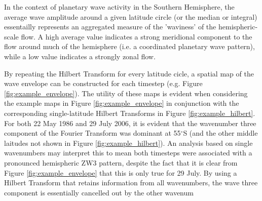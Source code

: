 In the context of planetary wave activity in the Southern Hemisphere, the average wave amplitude around a given latitude circle (or the median or integral) essentailly represents an aggregated measure of the 'waviness' of the hemispheric-scale flow. A high average value indicates a strong meridional component to the flow around much of the hemisphere (i.e. a coordinated planetary wave pattern), while a low value indicates a strongly zonal flow. 

By repeating the Hilbert Transform for every latitude cicle, a spatial map of the wave envelope can be constructed for each timestep (e.g. Figure \ref{fig:example_envelope}). The utility of these maps is evident when considering the example maps in Figure \ref{fig:example_envelope} in conjunction with the corresponding single-latitude Hilbert Transforms in Figure \ref{fig:example_hilbert}. For both 22 May 1986 and 29 July 2006, it is evident that the wavenumber three component of the Fourier Transform was dominant at 55$^{\circ}$S (and the other middle laitudes not shown in Figure \ref{fig:example_hilbert}). An analysis based on single wavenumbers may interpret this to mean both timesteps were associated with a pronounced hemispheric ZW3 pattern, despite the fact that it is clear from Figure \ref{fig:example_envelope} that this is only true for 29 July. By using a Hilbert Transform that retains information from all wavenumbers, the wave three component is essentially cancelled out by the other wavenum
